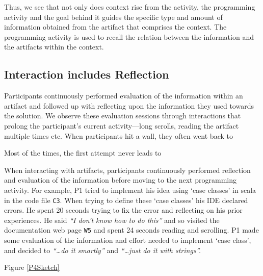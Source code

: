 Thus, we see that not only does context rise from the activity, the programming activity and the goal behind it guides the specific type and amount of information obtained from the artifact that comprises the context. The programming activity is used to recall the relation between the information and the artifacts within the context.



\subsection{Interaction includes Reflection}


Participants continuously performed evaluation of the information within an artifact and followed up with reflecting upon the information they used towards the solution. We observe these evaluation sessions through interactions that prolong the participant's current activity---long scrolls, reading the artifact multiple times etc. When participants hit a wall, they often went back to 



Most of the times, the first attempt never leads to 

When interacting with artifacts, participants continuously performed reflection and evaluation of the information before moving to the next programming activity. For example, P1 tried to implement his idea using `case classes' in scala in the code file \texttt{C3}. When trying to define these `case classes' his IDE declared errors. He spent 20 seconds trying to fix the error and reflecting on his prior experiences. He said \emph{``I don't know how to do this''} and so visited the documentation web page \texttt{W5} and spent 24 seconds reading and scrolling. P1 made some evaluation of the information and effort needed to implement `case class', and decided to \emph{``\dots do it smartly''} and \emph{``\dots just do it with strings''.}

Figure \ref{P4Sketch}

